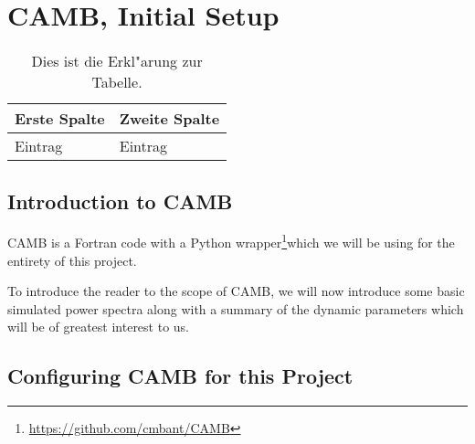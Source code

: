 \chapter{CAMB, Initial Setup}


\begin{table}[htb]
\centering
\begin{tabular}{l|l}
Erste Spalte & Zweite Spalte \\ \hline
Eintrag & Eintrag
\end{tabular}
 \caption[Kurzform f"ur das Tabellenverzeichnis]{Dies ist die Erkl"arung zur Tabelle.}
\end{table}

\section{Introduction to CAMB}

CAMB is a Fortran code with a Python wrapper\footnote{
\url{https://github.com/cmbant/CAMB}
}which we will be using for the
entirety of this project.

To introduce the reader to the scope of CAMB, we will now introduce
some basic simulated power spectra along with a summary of the dynamic
parameters which will be of greatest interest to us.

\section{Configuring CAMB for this Project}

\begin{comment}
\textcolor{blue}{
I hope to, in painstaking detail, cover many of the lines of the code that I
have written to interface with CAMB. I will include plots to indicate, at
every step, what incorrect settings cause the power spectrum to look like (or,
for subtler errors, what the error curves looked like compared to Ariel's
results, which I treated as a sort of ``ground truth''). This should also be a
good example to flex my physics interpretation skills: why does this incorrect
setting produce this undesired pattern?}

\textcolor{blue}{You might think that this is sort of an inappropriate 
section
for a master's thesis (especially since I have in mind that this be a lengthy 
section), but I would like to include it unless you feel very strongly. After 
all, I spent several months of the project debugging at least ten different 
ways that slight and major errors in the various settings led to 
irreconcilable results.}
\end{comment}

